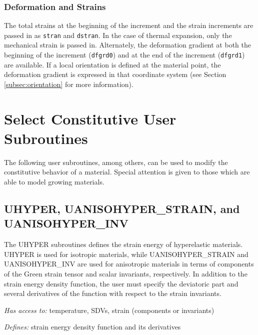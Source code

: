 \documentclass[10pt,letterpaper,oneside]{report}
\begin{document}
\subsubsection{Deformation and Strains}  
The total strains at the beginning of the increment and the strain increments are passed in as \texttt{stran} and \texttt{dstran}.  In the case of thermal expansion, only the mechanical strain is passed in.  Alternately, the deformation gradient at both the beginning of the increment (\texttt{dfgrd0}) and at the end of the increment (\texttt{dfgrd1}) are available.  If a local orientation is defined at the material point, the deformation gradient is expressed in that coordinate system (see Section \ref{subsec:orientation} for more information).  


\section{Select Constitutive User Subroutines}
The following user subroutines, among others, can be used to modify the constitutive behavior of a material.  Special attention is given to those which are able to model growing materials.

\subsection{UHYPER, UANISOHYPER\_STRAIN, and UANISOHYPER\_INV}
The UHYPER subroutines defines the strain energy of hyperelastic materials.  UHYPER is used for isotropic materials, while UANISOHYPER\_STRAIN and UANISOHYPER\_INV are used for anisotropic materials in terms of components of the Green strain tensor and scalar invariants, respectively.  In addition to the strain energy density function, the user must specify the deviatoric part and several derivatives of the function with respect to the strain invariants. 

\emph{Has access to:} temperature, SDVs, strain (components or invariants)

\emph{Defines:} strain energy density function and its derivatives



\end{document}
